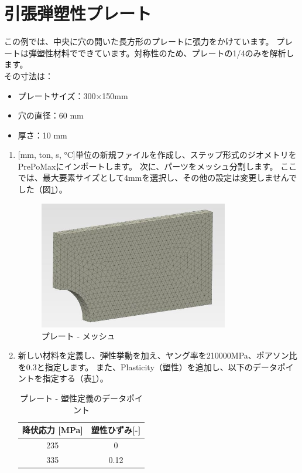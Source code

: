 \section{引張弾塑性プレート}
この例では、中央に穴の開いた長方形のプレートに張力をかけています。
プレートは弾塑性材料でできています。対称性のため、プレートの1/4のみを解析します。\\
その寸法は：
\begin{itemize}
\item プレートサイズ：300$\times$150mm
\item 穴の直径：60 mm
\item 厚さ：10 mm
\end{itemize}
\begin{enumerate}
\item
  {[}mm, ton, s, °C{]}単位の新規ファイルを作成し、ステップ形式のジオメトリをPrePoMaxにインポートします。
  次に、パーツをメッシュ分割します。
  ここでは、最大要素サイズとして4mmを選択し、その他の設定は変更しませんでした（図\ref{fig:07-01}）。
	\begin{figure}[H]
	\centering
	\includegraphics[width=83mm]{fig/07-01.png}
	\caption{プレート - メッシュ}
	\label{fig:07-01}
	\end{figure}
	\vspace{-\baselineskip}
\item
  新しい材料を定義し、弾性挙動を加え、ヤング率を210000MPa、ポアソン比を0.3と指定します。
  また、Plasticity（塑性）を追加し、以下のデータポイントを指定する（表\ref{tab:07-01}）。
	\begin{table}[H]
	\centering
	\caption{プレート - 塑性定義のデータポイント}
	\label{tab:07-01}
	\begin{tabular}{|c|c|}
	\hline
	降伏応力 {[}MPa{]} & 塑性ひずみ{[}-{]} \\ \hline
	235 & 0  \\ \hline
	335 & 0.12  \\ \hline
	\end{tabular}
	\end{table}

\end{enumerate}
